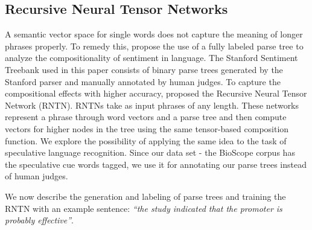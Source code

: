 \documentclass{article}
\begin{document}
\subsection{Recursive Neural Tensor Networks}

A semantic vector space for single words does not capture the meaning of longer phrases properly. To remedy this, \textcite{Socher2013} propose the use of a fully labeled parse tree to analyze the compositionality of sentiment in language. The Stanford Sentiment Treebank used in this paper consists of binary parse trees generated by the Stanford parser and manually annotated by human judges. To capture the compositional effects with higher accuracy, \textcite{Socher2013} proposed the Recursive Neural Tensor Network (RNTN). RNTNs take as input phrases of any length. These networks represent a phrase through word vectors and a parse tree and then compute vectors for higher nodes in the tree using the same tensor-based composition function. We explore the possibility of applying the same idea to the task of speculative language recognition.  Since our data set - the BioScope corpus \autocite{Vincze2008} has the speculative cue words tagged, we use it for annotating our parse trees instead of human judges.

We now describe the generation and labeling of parse trees and training the RNTN with an example sentence: {\it``the study indicated that the promoter is probably effective''}.
\end{document}
